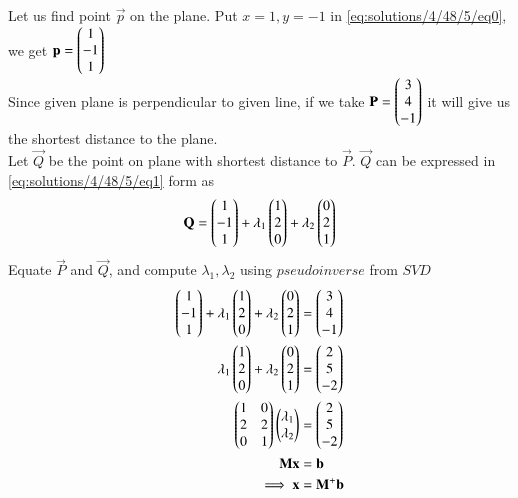 Let us find point $\vec{p}$ on the plane. Put $x=1,y=-1$ in \eqref{eq:solutions/4/48/5/eq0}, we get $\mathbf{p} = \begin{pmatrix}1\\-1\\1\end{pmatrix}$\\
Since given plane is perpendicular to given line, if we take $\mathbf{P} = \begin{pmatrix}3 \\ 4 \\ -1\end{pmatrix}$ it will give us the shortest distance to the plane. \\
Let $\vec{Q}$ be the point on plane with shortest distance to $\vec{P}$. $\vec{Q}$ can be expressed in \eqref{eq:solutions/4/48/5/eq1} form as
\begin{align}\label{eq:solutions/4/48/5/eq3}
	\mathbf{Q} = \begin{pmatrix}1\\-1\\1\end{pmatrix} + \lambda_1\begin{pmatrix}1\\2\\0\end{pmatrix} + \lambda_2\begin{pmatrix}0\\2\\1\end{pmatrix}
\end{align}
Equate $\vec{P}$ and $\vec{Q}$, and compute $\lambda_1, \lambda_2$ using $\textit{pseudoinverse}$ from $\textit{SVD}$
\begin{align}
	\begin{pmatrix}1\\-1\\1\end{pmatrix} + \lambda_1\begin{pmatrix}1\\2\\0\end{pmatrix} + \lambda_2\begin{pmatrix}0\\2\\ 1\end{pmatrix} &= \begin{pmatrix}3\\4\\-1\end{pmatrix}\\
	\lambda_1\begin{pmatrix}1\\2\\0\end{pmatrix} + \lambda_2\begin{pmatrix}0\\2\\ 1\end{pmatrix} &= \begin{pmatrix}2\\5\\-2\end{pmatrix}\\
	\label{eq:solutions/4/48/5/eq4}\begin{pmatrix}1 & 0\\2 & 2\\0 & 1\end{pmatrix} \begin{pmatrix}\lambda_1 \\ \lambda_2\end{pmatrix} &=\begin{pmatrix}2\\5\\-2\end{pmatrix}\\
	\label{eq:solutions/4/48/5/eq5}\mathbf{M}\mathbf{x} &= \mathbf{b}\\
	\label{eq:solutions/4/48/5/eq6}\implies\mathbf{x} &= \mathbf{M}^{+}\mathbf{b}
\end{align}
